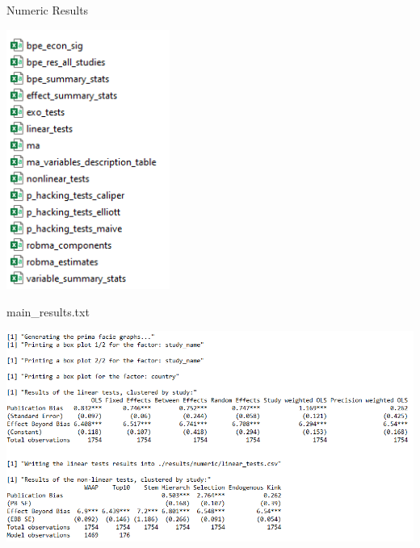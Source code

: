 \documentclass{beamer} %
\begin{document}
\begin{frame}{Numeric Results}
    \begin{center}
        \includegraphics[width=0.4\textwidth]{Figures/numeric_results.png}
    \end{center}
\end{frame}

\begin{frame}{main\_results.txt}
    \begin{center}
        \includegraphics[width=1\textwidth]{Figures/main_results.png}
    \end{center}
\end{frame}
\end{document}
